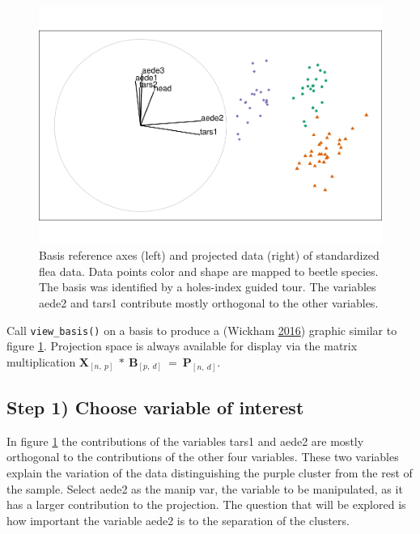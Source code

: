 \begin{Schunk}
\begin{figure}

{\centering \includegraphics[width=0.7\linewidth]{spinifex_paper_files/figure-latex/step0-1} 

}

\caption[Basis reference axes (left) and projected data (right) of standardized flea data]{Basis reference axes (left) and projected data (right) of standardized flea data. Data points color and shape are mapped to beetle species. The basis was identified by a holes-index guided tour. The variables aede2 and tars1 contribute mostly orthogonal to the other variables.}\label{fig:step0}
\end{figure}
\end{Schunk}

Call \texttt{view\_basis()} on a basis to produce a 
(Wickham \protect\hyperlink{ref-wickham_ggplot2:_2016}{2016}) graphic
similar to figure \ref{fig:step0}. Projection space is always available
for display via the matrix multiplication
\(\textbf{X}_{[n,~p]} ~*~ \textbf{B}_{[p,~d]} ~=~ \textbf{P}_{[n,~d]}\).

\hypertarget{step-1-choose-variable-of-interest}{%
\subsection{Step 1) Choose variable of
interest}\label{step-1-choose-variable-of-interest}}

In figure \ref{fig:step0} the contributions of the variables tars1 and
aede2 are mostly orthogonal to the contributions of the other four
variables. These two variables explain the variation of the data
distinguishing the purple cluster from the rest of the sample. Select
aede2 as the manip var, the variable to be manipulated, as it has a
larger contribution to the projection. The question that will be
explored is how important the variable aede2 is to the separation of the
clusters.

